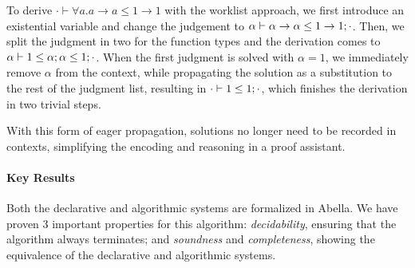 \begin{comment}
When Rule $\mathtt{{<:}{\to}}$ is applied in their algorithm, we
simply add a judgment to the judgment list and let the algorithm
continue focusing on the first branch. When an existential variable
can be solved to some monotype, we substitute the variable by its
solution to each of the judgments.
\end{comment}

To derive $\cdot\vdash \forall a. a\to a \le 1\to 1$
with the worklist approach, we first introduce an existential variable
and change the judgement to
$\alpha\vdash \alpha\to\alpha \le 1\to 1 ; \cdot$. Then, we
split the judgment in two for the function types and the derivation
comes to $\alpha\vdash 1\le \alpha ; \alpha \le 1 ; \cdot$. When the first
judgment is solved with $\alpha = 1$, we immediately remove $\alpha$
from the context, while propagating the solution as a substitution to
the rest of the judgment list, resulting in $\cdot\vdash 1 \le 1 ; \cdot$,
which finishes the derivation in two trivial steps.

With this form of eager propagation, solutions no longer
need to be recorded in contexts, simplifying the encoding and
reasoning in a proof assistant.

\paragraph{Key Results}
Both the declarative and algorithmic systems are formalized in Abella.
We have proven 3 important properties for this algorithm: 
\emph{decidability}, ensuring that the algorithm always terminates; and \emph{soundness} and
\emph{completeness}, showing the equivalence of the declarative and algorithmic systems. 





